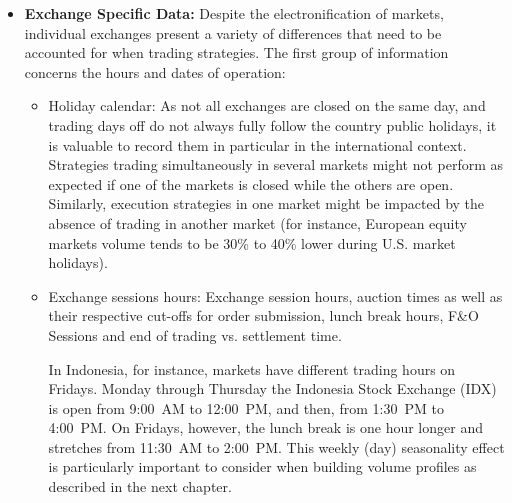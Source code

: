 \begin{itemize}
Maintaining a table of the quotation currency per instrument is also necessary in order to be able to aggregate positions at a portfolio level. Some exchanges allow the quotation of prices in currencies different from the one of the country in which the exchange is located.\footnote{For example, Jardine Matheson Holdings quotes in USD on the Singapore exchange while most of the other securities quote in Singapore Dollars.} Additionally, the Quote Factor associated with the quotation currency data needs to be stored. To account for the wide range of currency values and preserve pricing precision, market data providers might be publishing FX rates with a factor of 100 or 1000. Hence, to convert prices to USD one needs to multiply by the quote factor: usd price $=$ local price $\cdot$ fx $\cdot$ quote factor. Similarly, some exchanges quote prices in cents, and the associated quotation currency is reflected with a small cap letter: GBP/GBp, ZAR/ZAr, ILS/ILs, \dots).


\item \textbf{Exchange Specific Data:}  Despite the electronification of markets, individual exchanges present a variety of differences that need to be accounted for when trading strategies. The first group of information concerns the hours and dates of operation:
\begin{itemize}
\item Holiday calendar: As not all exchanges are closed on the same day, and trading days off do not always fully follow the country public holidays, it is valuable to record them in particular in the international context. Strategies trading simultaneously in several markets might not perform as expected if one of the markets is closed while the others are open. Similarly, execution strategies in one market might be impacted by the absence of trading in another market (for instance, European equity markets volume tends to be 30\% to 40\% lower during U.S. market holidays).

\item Exchange sessions hours: Exchange session hours, auction times as well as their respective cut-offs for order submission, lunch break hours, F\&O Sessions and end of trading vs. settlement time.

In Indonesia, for instance, markets have different trading hours on Fridays. Monday through Thursday the Indonesia Stock Exchange (IDX) is open from 9:00~AM to 12:00~PM, and then, from 1:30~PM to 4:00~PM. On Fridays, however, the lunch break is one hour longer and stretches from 11:30~AM to 2:00~PM. This weekly (day) seasonality effect is particularly important to consider when building volume profiles as described in the next chapter.


\end{itemize}
\end{itemize}
